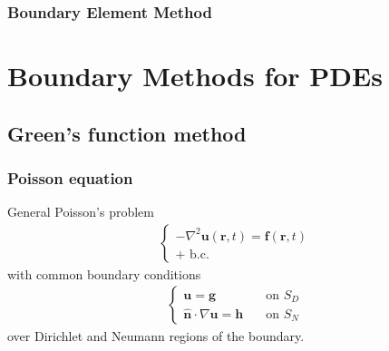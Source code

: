 \documentclass[letterpaper,10pt,english]{jupyterBook}
\begin{document}
\sphinxstepscope


\section{Boundary Element Method}
\label{\detokenize{ch/pde/bem:boundary-element-method}}\label{\detokenize{ch/pde/bem:pdf-bem}}\label{\detokenize{ch/pde/bem::doc}}
\sphinxstepscope


\part{Boundary Methods for PDEs}

\sphinxstepscope




\chapter{Green’s function method}
\label{\detokenize{ch/pde/bem-poisson-helmholtz-waves:green-s-function-method}}\label{\detokenize{ch/pde/bem-poisson-helmholtz-waves:math-green-function}}\label{\detokenize{ch/pde/bem-poisson-helmholtz-waves::doc}}

\section{Poisson equation}
\label{\detokenize{ch/pde/bem-poisson-helmholtz-waves:poisson-equation}}\label{\detokenize{ch/pde/bem-poisson-helmholtz-waves:classical-electromagnetism-green-function-poisson}}
\sphinxAtStartPar
General Poisson’s problem
\begin{equation*}
\begin{split}\begin{cases}
  - \nabla^2 \mathbf{u}(\mathbf{r}, t) = \mathbf{f}(\mathbf{r},t) \\
  \text{+ b.c.}
\end{cases}\end{split}
\end{equation*}
\sphinxAtStartPar
with common boundary conditions
\begin{equation*}
\begin{split}\begin{cases}
\mathbf{u} = \mathbf{g} & \quad \text{on $S_D$} \\
\hat{\mathbf{n}} \cdot \nabla \mathbf{u} = \mathbf{h} & \quad \text{on $S_N$}
\end{cases}\end{split}
\end{equation*}
\sphinxAtStartPar
over Dirichlet and Neumann regions of the boundary.
\end{document}
